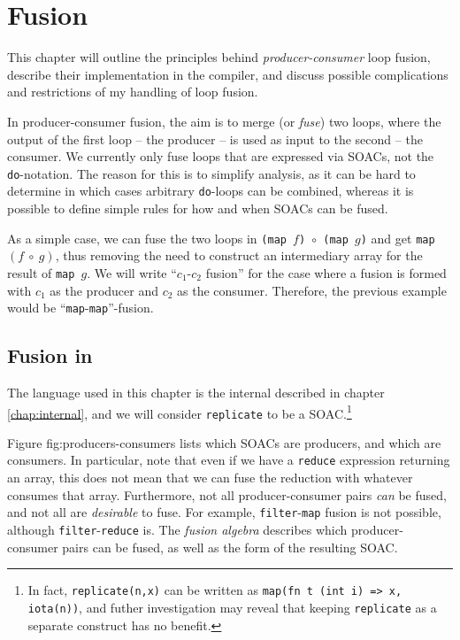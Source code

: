 \chapter{Fusion}
\label{chap:fusion}

This chapter will outline the principles behind
\textit{producer-consumer} loop fusion, describe their implementation
in the \LO{} compiler, and discuss possible complications and
restrictions of my handling of loop fusion.

In producer-consumer fusion, the aim is to merge (or \textit{fuse})
two loops, where the output of the first loop -- the producer -- is
used as input to the second -- the consumer.  We currently only fuse
loops that are expressed via SOACs, not the \texttt{do}-notation.  The
reason for this is to simplify analysis, as it can be hard to
determine in which cases arbitrary \texttt{do}-loops can be combined,
whereas it is possible to define simple rules for how and when SOACs
can be fused.

As a simple case, we can fuse the two loops in
\texttt{(map~$f$)~$\circ$~(map~$g$)} and get
\texttt{map~$(f~\circ~g)$}, thus removing the need to construct an
intermediary array for the result of \texttt{map~$g$}.  We will write
``$c_{1}$-$c_{2}$ fusion'' for the case where a fusion is formed with
$c_{1}$ as the producer and $c_{2}$ as the consumer.  Therefore, the
previous example would be ``\texttt{map}-\texttt{map}''-fusion.

\section{Fusion in \LO{}}

The language used in this chapter is the internal \LO{} described in
chapter \ref{chap:internal}, and we will consider \texttt{replicate}
to be a SOAC.\footnote{In fact, \texttt{replicate(n,x)} can be written
  as \texttt{map(fn t (int i) => x, iota(n))}, and futher
  investigation may reveal that keeping \texttt{replicate} as a
  separate construct has no benefit.}

Figure {fig:producers-consumers} lists which \LO{} SOACs are
producers, and which are consumers.  In particular, note that even if
we have a \texttt{reduce} expression returning an array, this does not
mean that we can fuse the reduction with whatever consumes that array.
Furthermore, not all producer-consumer pairs \textit{can} be fused,
and not all are \textit{desirable} to fuse.  For example,
\texttt{filter}-\texttt{map} fusion is not possible, although
\texttt{filter}-\texttt{reduce} is.  The \textit{fusion
  algebra} describes which producer-consumer pairs
can be fused, as well as the form of the resulting SOAC.

